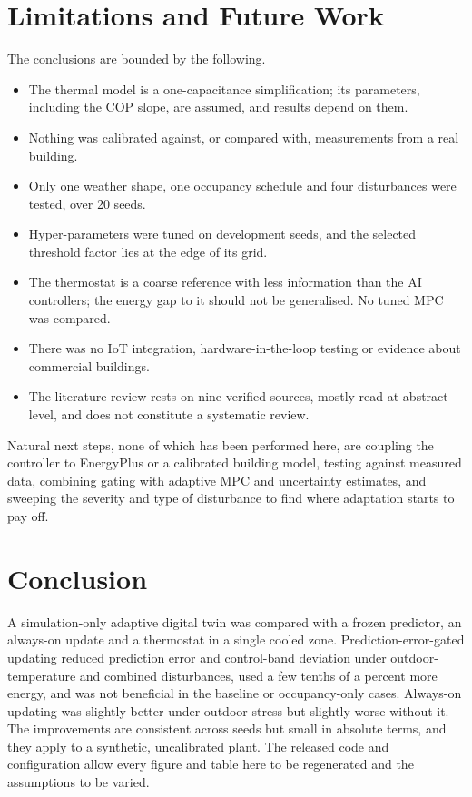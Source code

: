 \documentclass[conference]{IEEEtran}
\begin{document}
\section{Limitations and Future Work}
The conclusions are bounded by the following.
\begin{itemize}
\item The thermal model is a one-capacitance simplification; its parameters, including the COP slope, are assumed, and results depend on them.
\item Nothing was calibrated against, or compared with, measurements from a real building.
\item Only one weather shape, one occupancy schedule and four disturbances were tested, over 20 seeds.
\item Hyper-parameters were tuned on development seeds, and the selected threshold factor lies at the edge of its grid.
\item The thermostat is a coarse reference with less information than the AI controllers; the energy gap to it should not be generalised. No tuned MPC was compared.
\item There was no IoT integration, hardware-in-the-loop testing or evidence about commercial buildings.
\item The literature review rests on nine verified sources, mostly read at abstract level, and does not constitute a systematic review.
\end{itemize}
Natural next steps, none of which has been performed here, are coupling the controller to EnergyPlus or a calibrated building model, testing against measured data, combining gating with adaptive MPC and uncertainty estimates, and sweeping the severity and type of disturbance to find where adaptation starts to pay off.

\section{Conclusion}
A simulation-only adaptive digital twin was compared with a frozen predictor, an always-on update and a thermostat in a single cooled zone. Prediction-error-gated updating reduced prediction error and control-band deviation under outdoor-temperature and combined disturbances, used a few tenths of a percent more energy, and was not beneficial in the baseline or occupancy-only cases. Always-on updating was slightly better under outdoor stress but slightly worse without it. The improvements are consistent across seeds but small in absolute terms, and they apply to a synthetic, uncalibrated plant. The released code and configuration allow every figure and table here to be regenerated and the assumptions to be varied.
\end{document}
